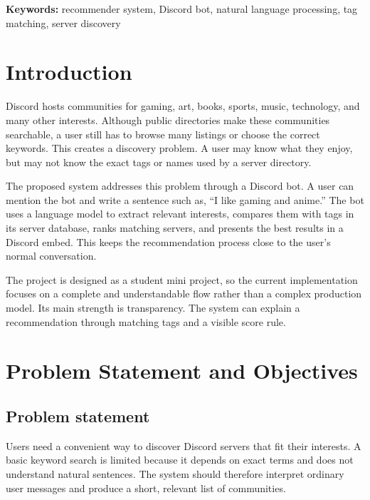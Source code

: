 \documentclass[11pt,a4paper]{article}
\begin{document}
\textbf{Keywords:} recommender system, Discord bot, natural language processing, tag matching, server discovery

\tableofcontents
\newpage

\section{Introduction}

Discord hosts communities for gaming, art, books, sports, music, technology, and many other interests. Although public directories make these communities searchable, a user still has to browse many listings or choose the correct keywords. This creates a discovery problem. A user may know what they enjoy, but may not know the exact tags or names used by a server directory.

The proposed system addresses this problem through a Discord bot. A user can mention the bot and write a sentence such as, ``I like gaming and anime.'' The bot uses a language model to extract relevant interests, compares them with tags in its server database, ranks matching servers, and presents the best results in a Discord embed. This keeps the recommendation process close to the user's normal conversation.

The project is designed as a student mini project, so the current implementation focuses on a complete and understandable flow rather than a complex production model. Its main strength is transparency. The system can explain a recommendation through matching tags and a visible score rule.

\section{Problem Statement and Objectives}

\subsection{Problem statement}
Users need a convenient way to discover Discord servers that fit their interests. A basic keyword search is limited because it depends on exact terms and does not understand natural sentences. The system should therefore interpret ordinary user messages and produce a short, relevant list of communities.
\end{document}
